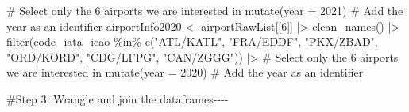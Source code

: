 \documentclass[
  letterpaper,
  DIV=11,
  numbers=noendperiod]{scrartcl}
\newenvironment{Shaded}{\begin{snugshade}}{\end{snugshade}}
\newcommand{\AttributeTok}[1]{\textcolor[rgb]{0.40,0.45,0.13}{#1}}
\newcommand{\CommentTok}[1]{\textcolor[rgb]{0.37,0.37,0.37}{#1}}
\newcommand{\DecValTok}[1]{\textcolor[rgb]{0.68,0.00,0.00}{#1}}
\newcommand{\FunctionTok}[1]{\textcolor[rgb]{0.28,0.35,0.67}{#1}}
\newcommand{\NormalTok}[1]{\textcolor[rgb]{0.00,0.23,0.31}{#1}}
\newcommand{\OtherTok}[1]{\textcolor[rgb]{0.00,0.23,0.31}{#1}}
\newcommand{\SpecialCharTok}[1]{\textcolor[rgb]{0.37,0.37,0.37}{#1}}
\newcommand{\StringTok}[1]{\textcolor[rgb]{0.13,0.47,0.30}{#1}}
\begin{document}
\begin{Shaded}
\begin{Highlighting}[]
  \CommentTok{\# Select only the 6 airports we are interested in}
  \FunctionTok{mutate}\NormalTok{(}\AttributeTok{year =} \DecValTok{2021}\NormalTok{) }\CommentTok{\# Add the year as an identifier}
\NormalTok{airportInfo2020 }\OtherTok{\textless{}{-}}\NormalTok{ airportRawList[[}\DecValTok{6}\NormalTok{]] }\SpecialCharTok{|\textgreater{}}
  \FunctionTok{clean\_names}\NormalTok{() }\SpecialCharTok{|\textgreater{}}
  \FunctionTok{filter}\NormalTok{(}\StringTok{\textasciigrave{}}\AttributeTok{code\_iata\_icao}\StringTok{\textasciigrave{}} \SpecialCharTok{\%in\%} \FunctionTok{c}\NormalTok{(}\StringTok{"ATL/KATL"}\NormalTok{, }\StringTok{"FRA/EDDF"}\NormalTok{, }\StringTok{"PKX/ZBAD"}\NormalTok{,}
                                 \StringTok{"ORD/KORD"}\NormalTok{, }\StringTok{"CDG/LFPG"}\NormalTok{, }\StringTok{"CAN/ZGGG"}\NormalTok{)) }\SpecialCharTok{|\textgreater{}} 
  \CommentTok{\# Select only the 6 airports we are interested in}
  \FunctionTok{mutate}\NormalTok{(}\AttributeTok{year =} \DecValTok{2020}\NormalTok{) }\CommentTok{\# Add the year as an identifier}
  
\CommentTok{\#Step 3: Wrangle and join the dataframes{-}{-}{-}{-}}


\end{Highlighting}
\end{Shaded}
\end{document}
